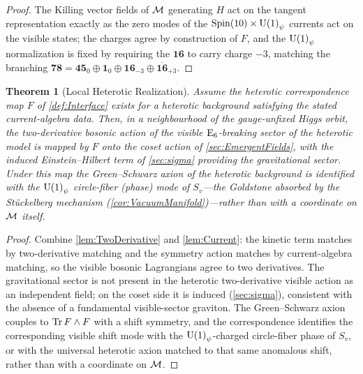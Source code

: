 \documentclass[pdflatex,sn-mathphys-num]{sn-jnl}
\theoremstyle{thmstyleone}
\newtheorem{theorem}{Theorem}
\theoremstyle{thmstylethree}%
\theoremstyle{thmstyletwo}%
\begin{document}
\begin{proof}
The Killing vector fields of $\mathcal{M}$ generating $H$ act on the tangent
representation exactly as the zero modes of the $\operatorname{Spin}(10)\times\mathrm{U(1)}_\psi$
currents act on the visible states; the charges agree by construction of $F$,
and the $\mathrm{U(1)}_\psi$ normalization is fixed by requiring the $\mathbf{16}$ to carry
charge $-3$, matching the branching
$\mathbf{78}=\mathbf{45}_{0}\oplus\mathbf{1}_{0}
\oplus\mathbf{16}_{-3}\oplus\overline{\mathbf{16}}_{+3}$.
\end{proof}

\begin{theorem}[Local Heterotic Realization]
\label{thm:Holographic}
Assume the heterotic correspondence map \(F\) of \autoref{def:Interface} exists for a
heterotic background satisfying the stated current-algebra data. Then, in a
neighbourhood of the gauge-unfixed Higgs orbit, the two-derivative bosonic
action of the visible $\mathrm{E}_{6}$-breaking sector of the heterotic model is mapped by
$F$ onto the coset action of \autoref{sec:EmergentFields}, with the induced
Einstein--Hilbert term of \autoref{sec:sigma} providing the gravitational
sector.  Under this map the Green--Schwarz axion \cite{GreenSchwarz:1984} of the
heterotic background is identified with the $\mathrm{U(1)}_\psi$ circle-fiber (phase)
mode of $S_{v}$---the Goldstone absorbed by the St\"uckelberg mechanism
(\autoref{cor:VacuumManifold})---rather than with a coordinate on $\mathcal{M}$ itself.
\end{theorem}

\begin{proof}
Combine \autoref{lem:TwoDerivative} and \autoref{lem:Current}: the kinetic term
matches by two-derivative matching and the symmetry action matches by
current-algebra matching, so the visible bosonic Lagrangians agree to two
derivatives.  The gravitational sector is not present in the heterotic
two-derivative visible action as an independent field; on the coset side it is
induced (\autoref{sec:sigma}), consistent with the absence of a fundamental
visible-sector graviton. The Green--Schwarz axion couples to
$\operatorname{Tr} F\wedge F$ with a shift symmetry, and the correspondence identifies the
corresponding visible shift mode with the $\mathrm{U(1)}_\psi$-charged circle-fiber
phase of $S_v$, or with the universal heterotic axion matched to that same
anomalous shift, rather than with a coordinate on $\mathcal{M}$.
\end{proof}
\end{document}
